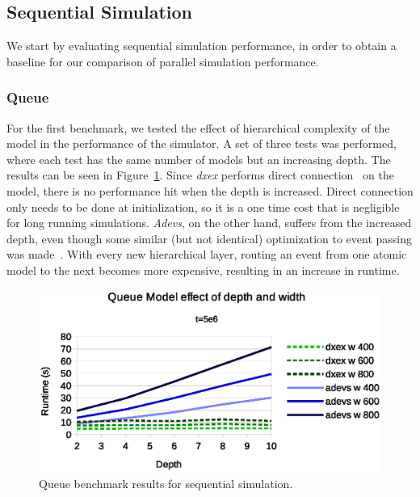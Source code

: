\subsection{Sequential Simulation}
We start by evaluating sequential simulation performance, in order to obtain a baseline for our comparison of parallel simulation performance.

\subsubsection{Queue}
\label{4-seq-Queue}
For the first benchmark, we tested the effect of hierarchical complexity of the model in the performance of the simulator.
A set of three tests was performed, where each test has the same number of models but an increasing depth.
The results can be seen in Figure~\ref{fig:Queue_benchmark_seq}.
Since \textit{dxex} performs direct connection~\cite{SymbolicFlattening} on the model, there is no performance hit when the depth is increased.
Direct connection only needs to be done at initialization, so it is a one time cost that is negligible for long running simulations.
\textit{Adevs}, on the other hand, suffers from the increased depth, even though some similar (but not identical) optimization to event passing was made~\cite{adevs_opt}.
With every new hierarchical layer, routing an event from one atomic model to the next becomes more expensive, resulting in an increase in runtime.

\begin{figure}
	\center
	\includegraphics[width=\columnwidth]{fig/queue_fixed_sequential.eps}
	\caption{Queue benchmark results for sequential simulation.}
	\label{fig:Queue_benchmark_seq}
\end{figure}

